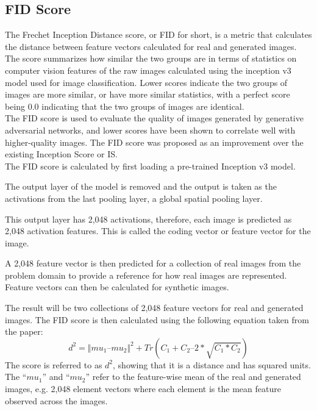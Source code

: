             \subsection{FID Score}
                The Frechet Inception Distance score, or FID for short, is a metric that calculates the distance between feature vectors calculated for real and generated images.\\
                The score summarizes how similar the two groups are in terms of statistics on computer vision features of the raw images calculated using the inception v3 model used for image classification. Lower scores indicate the two groups of images are more similar, or have more similar statistics, with a perfect score being 0.0 indicating that the two groups of images are identical.\\    
                The FID score is used to evaluate the quality of images generated by generative adversarial networks, and lower scores have been shown to correlate well with higher-quality images. The FID score was proposed as an improvement over the existing Inception Score or IS.\\
                The FID score is calculated by first loading a pre-trained Inception v3 model.

                The output layer of the model is removed and the output is taken as the activations from the last pooling layer, a global spatial pooling layer.

                This output layer has 2,048 activations, therefore, each image is predicted as 2,048 activation features. This is called the coding vector or feature vector for the image.

                A 2,048 feature vector is then predicted for a collection of real images from the problem domain to provide a reference for how real images are represented. Feature vectors can then be calculated for synthetic images.

                The result will be two collections of 2,048 feature vectors for real and generated images.
                The FID score is then calculated using the following equation taken from the paper:
                \begin{equation}
                    {d^2 = {\Vert mu_1 – mu_2 \Vert}^2 + Tr(C_1 + C_2 – 2*\sqrt{C_1*C_2})}
                \end{equation}
                The score is referred to as ${d^2}$, showing that it is a distance and has squared units. The “${mu_1}$” and “${mu_2}$” refer to the feature-wise mean of the real and generated images, e.g. 2,048 element vectors where each element is the mean feature observed across the images.\\

